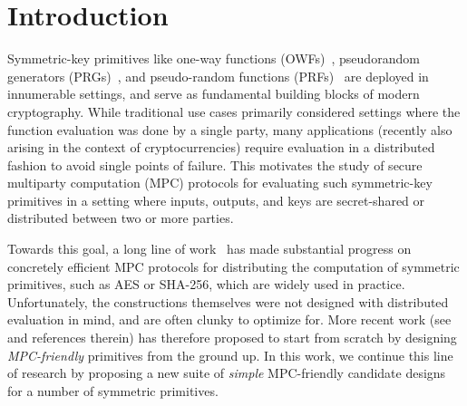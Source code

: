 
\section{Introduction}
\label{sec:introduction}



\medskip

Symmetric-key primitives like one-way functions (OWFs)~\cite{levin1985-owf},
 pseudorandom generators (PRGs)~\cite{blum1984-prg,yao1982-prg}, 
and pseudo-random functions (PRFs)~\cite{goldreich1984-prf} are deployed in innumerable settings, and serve as fundamental building blocks of modern cryptography. While traditional use cases primarily considered settings where the function evaluation was done by a single party, many applications (recently also arising in the context of cryptocurrencies)
require evaluation in a distributed fashion to avoid single points of failure. This motivates the study of secure multiparty computation (MPC) protocols for evaluating such symmetric-key primitives in a setting where inputs, outputs, and keys are secret-shared or distributed between two or more parties.

Towards this goal, a long line of work~\cite{damgard2010-aes, pinkas2009-aes, wang2017-mpc} has made substantial progress on concretely efficient MPC protocols for distributing the computation of symmetric primitives, such as AES or SHA-256, which are widely used in practice. Unfortunately, the constructions themselves were not designed with distributed evaluation in mind, and are often clunky to optimize for. More recent work (see~\cite{albrecht2015-lowmc, grassi2016-mpcfriendly, boneh2018-darkmatter,albrecht2019-feistal-mpc, aly2020-design-mpc} and references therein) has therefore proposed to start from scratch by designing \textit{MPC-friendly} primitives from the ground up. 
In this work, we continue this line of research by proposing a new suite of \textit{simple} MPC-friendly candidate designs for a number of symmetric primitives.



